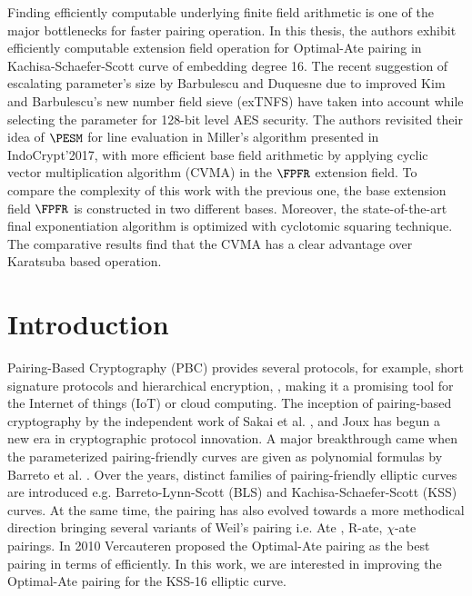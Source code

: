 Finding efficiently computable underlying finite field arithmetic is one of the major bottlenecks for faster pairing operation.
In this thesis, the authors exhibit efficiently computable extension field operation for Optimal-Ate pairing in Kachisa-Schaefer-Scott curve of embedding degree 16. 
The recent suggestion of escalating parameter's size by Barbulescu and Duquesne due to improved Kim and Barbulescu's new number field sieve (exTNFS) have taken into account while selecting the parameter for 128-bit  level AES security.
The authors revisited their idea of $\PESM$ for line evaluation in Miller's algorithm presented in IndoCrypt'2017, with more efficient base field arithmetic by applying cyclic vector multiplication algorithm (CVMA) in the $\FPFR$ extension field.
To compare the complexity of this work with the previous one,
the base extension field $\FPFR$ is constructed in two different bases.
Moreover, the state-of-the-art final exponentiation algorithm is optimized with cyclotomic squaring technique. 
The comparative results find that the CVMA has a clear advantage over Karatsuba based operation.

\section{Introduction}
\label{intro}
Pairing-Based Cryptography (PBC) provides several protocols, for example, short signature protocols and hierarchical encryption,   \cite{C:Shamir84}, making it a promising tool for the Internet of things (IoT) or cloud computing.
The inception of  pairing-based cryptography by the independent work of Sakai et al. \cite{sakai2000cryptosystems}, and Joux \cite{JC:Joux04} has begun a new era in cryptographic protocol innovation.
A major breakthrough came when the parameterized pairing-friendly curves are given as polynomial formulas by Barreto et al. \cite{SAC:BarNae05}. 
Over the years, distinct families of pairing-friendly elliptic curves are introduced e.g. Barreto-Lynn-Scott (BLS) \cite{SCN:BarLynSco02} and Kachisa-Schaefer-Scott (KSS) \cite{EPRINT:KacSchSco07} curves. 
At the same time, the pairing has also evolved towards a more methodical direction bringing several variants of Weil's pairing i.e. Ate \cite{DBLP:reference/crc/2005ehcc}, R-ate\cite{r_ate}, $\chi$-ate \cite{PAIRING:NASKM08} pairings. 
In 2010 Vercauteren proposed the Optimal-Ate pairing \cite{DBLP:journals/tit/Vercauteren10} as the best pairing in terms of efficiently. 
In this work, we are interested in improving the Optimal-Ate pairing for the KSS-16 elliptic curve. 

